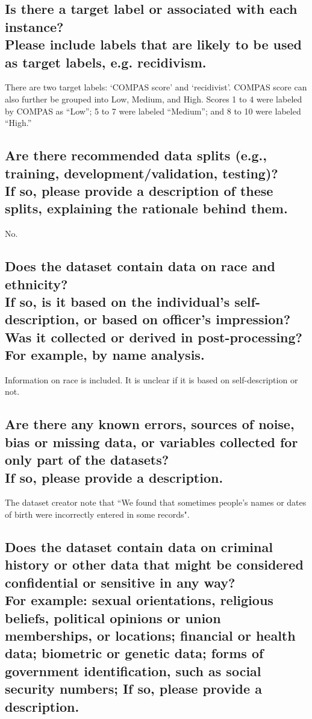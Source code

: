 \documentclass[letterpaper, 10 pt, conference]{ieeeconf}  %
\newcommand{\subtitle}[1]{{\\ \small \normalfont \color{purple} #1}}
\begin{document}
\subsection{Is there a target label or associated with each instance? \subtitle{Please include labels that are likely to be used as target labels, e.g. recidivism.}}

There are two target labels: `COMPAS score' and `recidivist'. COMPAS score can also further be grouped into Low, Medium, and High. 
Scores 1 to 4 were labeled by COMPAS as “Low”; 5 to 7 were labeled “Medium”; and 8 to 10 were labeled “High.”

\subsection{Are there recommended data splits (e.g., training, development/validation, testing)? \subtitle{If so, please provide a description of these splits, explaining the rationale behind them.}}

No.

\subsection{Does the dataset contain data on race and ethnicity? \subtitle{If so, is it based on the individual's self-description, or based on officer's impression? Was it collected or derived in post-processing? For example, by name analysis.}}

Information on race is included. It is unclear if it is based on self-description or not.

\subsection{Are there any known errors, sources of noise, bias or missing data, or variables collected for only part of the datasets? \subtitle{If so, please provide a description.}}

The dataset creator note that ``We found that sometimes people’s names or dates of birth were incorrectly entered in some records".

\subsection{Does the dataset contain data on criminal history or other data that might be considered confidential or sensitive in any way? \subtitle{For example: sexual orientations, religious beliefs, political opinions or union memberships, or locations; financial or health data; biometric or genetic data; forms of government identification, such as social security numbers; If so, please provide a description.}}
\end{document}
